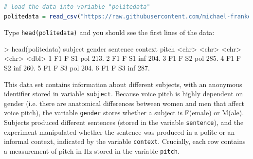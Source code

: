\documentclass[nobib]{tufte-handout}
\newcommand{\ri}[1]{\lstinline{#1}}  %
\begin{document}
\medskip

\begin{minipage}[]{\textwidth}
\begin{lstlisting}[language=R]
# load the data into variable "politedata"
politedata = read_csv("https://raw.githubusercontent.com/michael-franke/bayes_mixed_regression_tutorial/master/code/politeness_data.csv")
\end{lstlisting}
\end{minipage}

\vspace*{-0.5cm}

\noindent Type \ri{head(politedata)} and you should see the first lines of the
data:

\bigskip

\begin{minipage}[]{\textwidth}
\begin{rc}
> head(politedata)
   subject gender sentence context pitch
   <chr>   <chr>  <chr>    <chr>   <dbl>
 1 F1      F      S1       pol      213.
 2 F1      F      S1       inf      204.
 3 F1      F      S2       pol      285.
 4 F1      F      S2       inf      260.
 5 F1      F      S3       pol      204.
 6 F1      F      S3       inf      287.
\end{rc}
\end{minipage}


\medskip

\noindent This data set contains information about different subjects, with an anonymous identifier stored in variable \texttt{subject}.
Because voice pitch is highly dependent on gender (i.e. there are anatomical differences between women and men that affect voice pitch), the variable \texttt{gender} stores whether a subject is F(emale) or M(ale).
Subjects produced different sentences (stored in the variable \texttt{sentence}), and the experiment manipulated whether the sentence was produced in a polite or an informal context, indicated by the variable \texttt{context}. Crucially, each row contains a measurement of pitch in Hz stored in the variable \texttt{pitch}.
\end{document}
